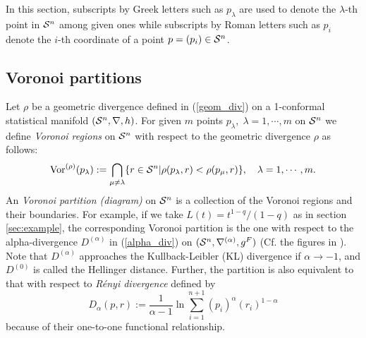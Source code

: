 \documentclass{llncs}
\begin{document}
In this section, subscripts by Greek letters such as $p_\lambda$  
are used to denote the $\lambda$-th point in ${\cal S}^n$ among given ones 
while subscripts by Roman letters such as $p_i$ denote 
the $i$-th coordinate of a point $p=(p_i) \in {\cal S}^n$.

\subsection{Voronoi partitions}

Let $\rho$ be a geometric divergence defined in (\ref{geom_div}) on a 
1-conformal statistical manifold $({\cal S}^n,\nabla, h)$.
For given $m$ points $p_\lambda, \; \lambda=1, \cdots, m$ on ${\cal S}^n$ 
we define {\em Voronoi regions} on ${\cal S}^n$ with respect to
the geometric divergence $\rho$ as follows:
\[
	{\rm Vor}^{(\rho)}(p_\lambda):=\bigcap_{\mu \not= \lambda} 
	\{ r \in {\cal S}^n | 
	\rho(p_\lambda,r)< \rho(p_\mu,r) \},
	\quad \lambda=1,\cdots,m.
\]
An {\em Voronoi partition (diagram)} on 
${\cal S}^n$ is a collection of the Voronoi regions and their boundaries.
For example, if we take $L(t)=t^{1-q}/(1-q)$ as in section \ref{sec:example}, 
the corresponding Voronoi partition is the one with respect to the 
alpha-divergence $D^{(\alpha)}$ in (\ref{alpha_div}) on 
$({\cal S}^n, \nabla^{(\alpha)},g^F)$ (Cf. the figures in \cite{OMA12} ).
Note that $D^{(\alpha)}$ approaches the Kullback-Leibler (KL) divergence 
if $\alpha \rightarrow -1$, and $D^{(0)}$ is called 
the Hellinger distance.
Further, the partition is also equivalent to that with respect to 
{\em R\'enyi divergence} \cite{Renyi} %
defined by
\[
	D_\alpha(p,r):= \frac{1}{\alpha-1} \ln 
		\sum_{i=1}^{n+1} (p_i)^{\alpha} (r_i)^{1-\alpha}
\]
because of their one-to-one functional relationship.
\end{document}
